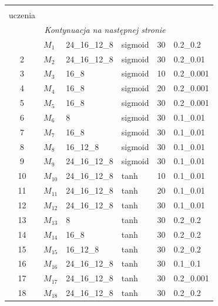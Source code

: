\begin{minipage}{\textwidth}
\begin{longtable}{|c|l|l|l|l|l|}
{\begin{tabular}[c]{@{}c@{}}
                                                  Współczynnik\\ uczenia
                     \end{tabular}} \\ \hline
                     \endhead
                     \hline \multicolumn{5}{r}{\textit{Kontynuacja na następnej stronie}} \\
                     \endfoot
                     \hline
                     \endlastfoot
                     1 & $M_{1}$ & 24\_16\_12\_8 & sigmoid & 30 & 0.2\_0.2 \\ \hline
                     2 & $M_{2}$ & 24\_16\_12\_8 & sigmoid & 30 & 0.2\_0.01 \\ \hline
                     3 & $M_{3}$ & 16\_8 & sigmoid & 10 & 0.2\_0.001 \\ \hline
                     4 & $M_{4}$ & 16\_8 & sigmoid & 20 & 0.2\_0.001 \\ \hline
                     5 & $M_{5}$ & 16\_8 & sigmoid & 30 & 0.2\_0.001 \\ \hline
                     6 & $M_{6}$ & 8 & sigmoid & 30 & 0.1\_0.01 \\ \hline
                     7 & $M_{7}$ & 16\_8 & sigmoid & 30 & 0.1\_0.01 \\ \hline
                     8 & $M_{8}$ & 16\_12\_8 & sigmoid & 30 & 0.1\_0.01 \\ \hline
                     9 & $M_{9}$ & 24\_16\_12\_8 & sigmoid & 30 & 0.1\_0.01 \\ \hline

                     10 & $M_{10}$ & 24\_16\_12\_8 & tanh & 10 & 0.1\_0.01 \\ \hline
                     11 & $M_{11}$ & 24\_16\_12\_8 & tanh & 20 & 0.1\_0.01 \\ \hline
                     12 & $M_{12}$ & 24\_16\_12\_8 & tanh & 30 & 0.1\_0.01 \\ \hline

                     13 & $M_{13}$ & 8 & tanh & 30 & 0.2\_0.2 \\ \hline
                     14 & $M_{14}$ & 16\_8 & tanh & 30 & 0.2\_0.2 \\ \hline
                     15 & $M_{15}$ & 16\_12\_8 & tanh & 30 & 0.2\_0.2 \\ \hline

                     16 & $M_{16}$ & 24\_16\_12\_8 & tanh & 30 & 0.1\_0.1 \\ \hline
                     17 & $M_{17}$ & 24\_16\_12\_8 & tanh & 30 & 0.2\_0.001 \\ \hline
                     18 & $M_{18}$ & 24\_16\_12\_8 & tanh & 30 & 0.2\_0.2 \\ \hline
                 \end{longtable}
    \end{minipage}

